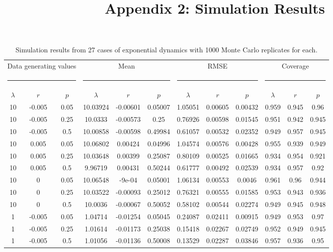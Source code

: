 \documentclass{article}
\begin{document}
\title{Appendix 2: Simulation Results}
\maketitle
\renewcommand*\thetable{S2.\arabic{table}}
\begin{table}[htb]
  \centering
  \footnotesize
  \caption{Simulation results from 27 cases of exponential dynamics with 1000 Monte Carlo replicates for each.}
  \begin{tabular}{cccccccccccc}
    \hline
    \multicolumn{3}{c}{Data generating values}&
    \multicolumn{3}{c}{Mean} &
    \multicolumn{3}{c}{RMSE} &
    \multicolumn{3}{c}{Coverage} \\
    \multicolumn{3}{c}{\rule{4cm}{1pt}} &
    \multicolumn{3}{c}{\rule{4cm}{1pt}} &
    \multicolumn{3}{c}{\rule{4cm}{1pt}} &
    \multicolumn{3}{c}{\rule{4cm}{1pt}} \\
    $\lambda$ & $r$ & $p$ & $\lambda$ & $r$ & $p$ & $\lambda$ & $r$ &
    $p$ & $\lambda$ & $r$ & $p$ \\
    \hline
10	&-0.005	&0.05	&10.03924	&-0.00601	&0.05007	&1.05051	&0.00605	&0.00432	&0.959	&0.945	&0.96\\
10	&-0.005	&0.25	&10.0333	&-0.00573	&0.25&0.76926	&0.00598	&0.01545 &0.951	&0.942	&0.945\\
10	&-0.005	&0.5	&10.00858	&-0.00598	&0.49984	&0.61057	&0.00532	&0.02352	&0.949	&0.957	&0.945\\
10	&0.005	&0.05	&10.06802	&0.00424	&0.04996	&1.04574	&0.00576	&0.00428	&0.955	&0.939	&0.949\\
10	&0.005	&0.25	&10.03648	&0.00399	&0.25087	&0.80109	&0.00525	&0.01665	&0.934	&0.954	&0.921\\
10	&0.005	&0.5	&9.96719	&0.00431	&0.50244	&0.61777	&0.00492	&0.02539	&0.934	&0.957	&0.92\\
10	&0	&0.05	&10.06548	&-9e-04	        &0.05001	&1.06134	&0.00553	&0.0046	&0.961	&0.96	&0.944\\
10	&0	&0.25	&10.03522	&-0.00093	&0.25012	&0.76321	&0.00555	&0.01585	&0.953	&0.943	&0.936\\
10	&0	&0.5	&10.0036	&-0.00067	&0.50052	&0.58102	&0.00544	&0.02274	&0.949	&0.945	&0.948\\
1	&-0.005	&0.05	&1.04714	&-0.01254	&0.05045	&0.24087	&0.02411	&0.00915	&0.949	&0.953	&0.97\\
1	&-0.005	&0.25	&1.01614	&-0.01173	&0.25038	&0.15418	&0.02267	&0.02749	&0.952	&0.949	&0.945\\
1	&-0.005	&0.5	&1.01056	&-0.01136	&0.50008	&0.13529	&0.02287	&0.03846	&0.957	&0.936	&0.95\\

\end{tabular}
\end{table}
\end{document}
